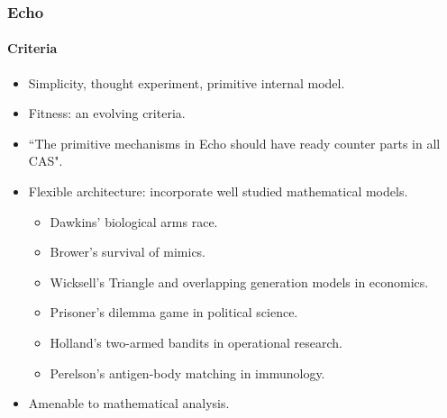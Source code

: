 \frame
{
	\frametitle{Echo}
	\framesubtitle{Criteria}

	\begin{itemize}
		\item Simplicity, thought experiment, primitive internal model.
		\item Fitness: an evolving criteria.
		\item ``The primitive mechanisms in Echo should have ready counter parts in all CAS".
		\item Flexible architecture: incorporate well studied mathematical models.
		\begin{itemize}
			\item Dawkins' biological arms race.
			\item Brower's survival of mimics.
			\item Wicksell's Triangle and overlapping generation models in economics.
			\item Prisoner's dilemma game in political science.
			\item Holland's two-armed bandits in operational research.
			\item Perelson's antigen-body matching in immunology.
		\end{itemize}
		\item Amenable to mathematical analysis.
	\end{itemize}
}